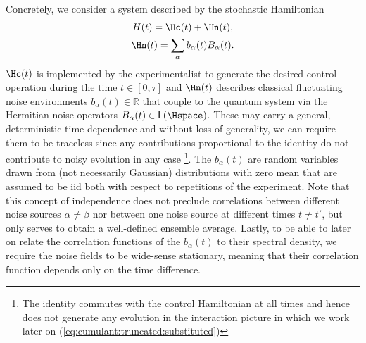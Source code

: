 Concretely, we consider a system described by the stochastic Hamiltonian
\begin{gather}
    H(t) = \Hc(t) + \Hn(t),\label{eq:hamiltonian} \\
    \Hn(t) = \sum_\alpha b_\alpha(t) B_\alpha(t). \label{eq:hamiltonian:noise}
\end{gather}
$\Hc(t)$ is implemented by the experimentalist to generate the desired control operation during the time $t\in [0, \tau]$ and $\Hn(t)$ describes classical fluctuating noise environments $b_\alpha(t)\in\mathbb{R}$ that couple to the quantum system via the Hermitian noise operators $B_\alpha(t)\in\mathsf{L}(\Hspace)$. These may carry a general, deterministic time dependence and without loss of generality, we can require them to be traceless since any contributions proportional to the identity do not contribute to noisy evolution in any case \footnote{The identity commutes with the control Hamiltonian at all times and hence does not generate any evolution in the interaction picture in which we work later on (\cf \cref{eq:cumulant:truncated:substituted})}. The $b_\alpha(t)$ are random variables drawn from (not necessarily Gaussian) distributions with zero mean that are assumed to be \gls{iid} both with respect to repetitions of the experiment. Note that this concept of independence does not preclude correlations between different noise sources $\alpha\neq\beta$ nor between one noise source at different times $t\neq t'$, but only serves to obtain a well-defined ensemble average. Lastly, to be able to later on relate the correlation functions of the $b_\alpha(t)$ to their spectral density, we require the noise fields to be wide-sense stationary, meaning that their correlation function depends only on the time difference.

